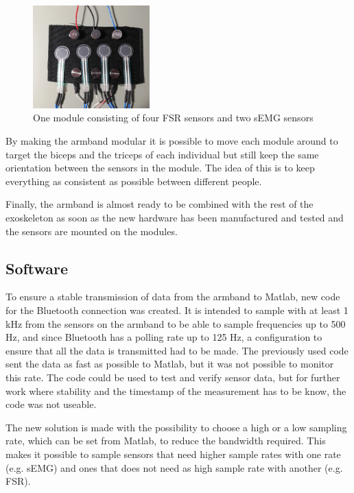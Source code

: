 \begin{figure}[htbp]
    \centering
    \includegraphics[width=0.4\textwidth]{figures/one_module.jpg}
    \caption{One module consisting of four FSR sensors and two sEMG sensors}
    \label{fig:onmodule}
\end{figure}

By making the armband modular it is possible to move each module around to target the biceps and the triceps of each individual but still keep the same orientation between the sensors in the module. The idea of this is to keep everything as consistent as possible between different people. 


Finally, the armband is almost ready to be combined with the rest of the exoskeleton as soon as the new hardware has been manufactured and tested and the sensors are mounted on the modules.

\subsection{Software}
To ensure a stable transmission of data from the armband to Matlab, new code for the Bluetooth connection was created. It is intended to sample with at least 1 kHz from the sensors on the armband to be able to sample frequencies up to 500 Hz, and since Bluetooth has a polling rate up to 125 Hz, a configuration to ensure that all the data is transmitted had to be made. The previously used code sent the data as fast as possible to Matlab, but it was not possible to monitor this rate. The code could be used to test and verify sensor data, but for further work where stability and the timestamp of the measurement has to be know, the code was not useable.

The new solution is made with the possibility to choose a high or a low sampling rate, which can be set from Matlab, to reduce the bandwidth required. This makes it possible to sample sensors that need higher sample rates with one rate (e.g. sEMG) and ones that does not need as high sample rate with another (e.g. FSR).

